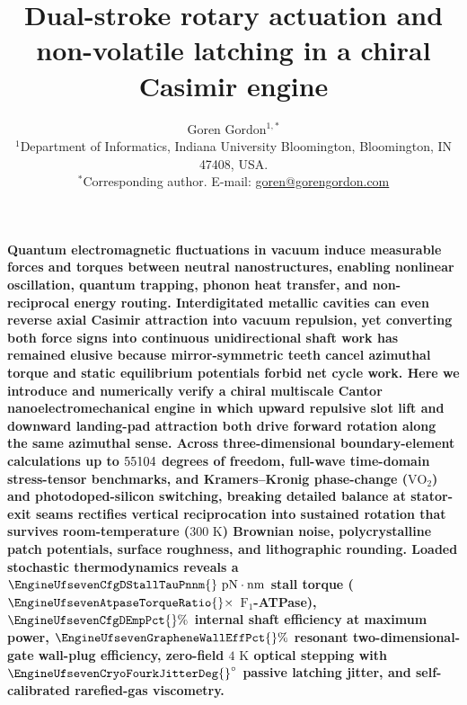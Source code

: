 \documentclass[11pt,a4paper]{article}
\title{\textbf{Dual-stroke rotary actuation and non-volatile latching in a chiral Casimir engine}}
\author{Goren Gordon$^{1,*}$\\[6pt]
\small $^{1}$Department of Informatics, Indiana University Bloomington, Bloomington, IN 47408, USA.\\
\small $^{*}$Corresponding author. E-mail: \href{mailto:goren@gorengordon.com}{goren@gorengordon.com}}
\date{}
\begin{document}
\maketitle

\noindent\textbf{Quantum electromagnetic fluctuations in vacuum induce measurable forces and torques between neutral nanostructures\cite{casimir1948,lifshitz1956,chan2001,somers2018}, enabling nonlinear oscillation, quantum trapping\cite{zhao2019}, phonon heat transfer\cite{fong2019}, and non-reciprocal energy routing\cite{xu2022natnano}. Interdigitated metallic cavities can even reverse axial Casimir attraction into vacuum repulsion\cite{levin2010,rodriguez2011}, yet converting both force signs into continuous unidirectional shaft work has remained elusive because mirror-symmetric teeth cancel azimuthal torque and static equilibrium potentials forbid net cycle work. Here we introduce and numerically verify a chiral multiscale Cantor nanoelectromechanical engine in which upward repulsive slot lift and downward landing-pad attraction both drive forward rotation along the same azimuthal sense. Across three-dimensional boundary-element calculations up to $55104{}$ degrees of freedom, full-wave time-domain stress-tensor benchmarks, and Kramers--Kronig phase-change ($\mathrm{VO}_2$) and photodoped-silicon switching, breaking detailed balance at stator-exit seams rectifies vertical reciprocation into sustained rotation that survives room-temperature ($300\text{ K}$) Brownian noise, polycrystalline patch potentials, surface roughness, and lithographic rounding. Loaded stochastic thermodynamics reveals a $\EngineUfsevenCfgDStallTauPnnm{}\text{ pN}\cdot\text{nm}$ stall torque ($\EngineUfsevenAtpaseTorqueRatio{}\times$ $\mathrm{F}_1$-ATPase), $\EngineUfsevenCfgDEmpPct{}\%$ internal shaft efficiency at maximum power, $\EngineUfsevenGrapheneWallEffPct{}\%$ resonant two-dimensional-gate wall-plug efficiency, zero-field $4\text{ K}$ optical stepping with $\EngineUfsevenCryoFourkJitterDeg{}^\circ$ passive latching jitter, and self-calibrated rarefied-gas viscometry.}

\vspace{14pt}
\end{document}
